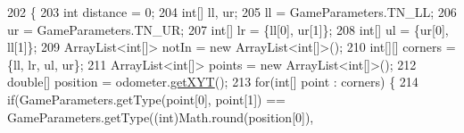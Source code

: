\begin{DoxyCode}
202                                                  \{
203     \textcolor{keywordtype}{int} distance = 0;
204     \textcolor{keywordtype}{int}[] ll, ur;
205     ll = GameParameters.TN\_LL;
206     ur = GameParameters.TN\_UR;
207     \textcolor{keywordtype}{int}[] lr = \{ll[0], ur[1]\};
208     \textcolor{keywordtype}{int}[] ul = \{ur[0], ll[1]\};
209     ArrayList<int[]> notIn = \textcolor{keyword}{new} ArrayList<int[]>();
210     \textcolor{keywordtype}{int}[][] corners = \{ll, lr, ul, ur\};
211     ArrayList<int[]> points = \textcolor{keyword}{new} ArrayList<int[]>();
212     \textcolor{keywordtype}{double}[] position = odometer.\hyperlink{classca_1_1mcgill_1_1ecse211_1_1odometer_1_1_odometer_data_a8f40f0264c68f0cbed4fff1723ae7863}{getXYT}();
213     \textcolor{keywordflow}{for}(\textcolor{keywordtype}{int}[] point : corners) \{
214       \textcolor{keywordflow}{if}(GameParameters.getType(point[0], point[1]) == GameParameters.getType((\textcolor{keywordtype}{int})Math.round(position[0]),
       

\end{DoxyCode}
